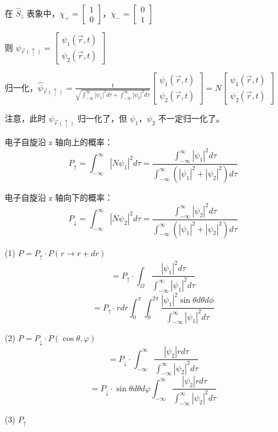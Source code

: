 \documentclass[lang=cn,10pt]{elegantbook}
\begin{document}
\begin{solution}
	在 $\hat{S}_z$ 表象中，$\chi_+ = \begin{bmatrix} 1 \\ 0 \end{bmatrix}$，$\chi_- = \begin{bmatrix} 0 \\ 1 \end{bmatrix}$
	
	则 $\psi_{\vec{r}(\uparrow)} = \begin{bmatrix} \psi_{1}(\vec{r}, t) \\ \psi_{2}(\vec{r}, t) \end{bmatrix}$
	
	归一化，$\hat{\psi}_{\vec{r}(\uparrow)} = \frac{1}{\sqrt{\int_{-\infty}^{\infty} |\psi_{1}|^2 d\tau + \int_{-\infty}^{\infty} |\psi_{2}|^2 d\tau}} \begin{bmatrix} \psi_{1}(\vec{r}, t) \\ \psi_{2}(\vec{r}, t) \end{bmatrix} = N \begin{bmatrix} \psi_{1}(\vec{r}, t) \\ \psi_{2}(\vec{r}, t) \end{bmatrix}$
	
	注意，此时 $\psi_{\vec{r}(\uparrow)}$ 归一化了，但 $\psi_{1}$，$\psi_{2}$ 不一定归一化了。
	
	电子自旋沿 z 轴向上的概率：
	\[
	P_{\uparrow} = \int_{-\infty}^{\infty} |N \psi_{1}|^2 d\tau = \frac{\int_{-\infty}^{\infty} |\psi_{1}|^2 d\tau}{\int_{-\infty}^{\infty} (|\psi_{1}|^2 + |\psi_{2}|^2) d\tau}
	\]
	
	电子自旋沿 z 轴向下的概率：
	\[
	P_{\downarrow} = \int_{-\infty}^{\infty} |N \psi_{2}|^2 d\tau = \frac{\int_{-\infty}^{\infty} |\psi_{2}|^2 d\tau}{\int_{-\infty}^{\infty} (|\psi_{1}|^2 + |\psi_{2}|^2) d\tau}
	\]
	
	(1) $P = P_{\uparrow} \cdot P(r \rightarrow r + dr)$
	\[
	= P_{\uparrow} \cdot \int_{\Omega} \frac{|\psi_{1}|^2 d\tau}{\int_{-\infty}^{\infty} |\psi_{1}|^2 d\tau}
	\]
	\[
	= P_{\uparrow} \cdot r dr \int_{0}^{\pi} \int_{0}^{2\pi} \frac{|\psi_{1}|^2 \sin\theta d\theta d\phi}{\int_{-\infty}^{\infty} |\psi_{1}|^2 d\tau}
	\]
	
	(2) $P = P_{\downarrow} \cdot P(\cos\theta, \varphi)$
	\[
	= P_{\downarrow} \cdot \int_{-\infty}^{\infty} \frac{|\psi_{2}| r d\tau}{\int_{-\infty}^{\infty} |\psi_{2}|^2 d\tau}
	\]
	\[
	= P_{\downarrow} \cdot \sin\theta d\theta d\varphi \int_{-\infty}^{\infty} \frac{|\psi_{2}| r d\tau}{\int_{-\infty}^{\infty} |\psi_{2}|^2 d\tau}
	\]
	
	(3) $P_{\uparrow}$
\end{solution}
\end{document}
